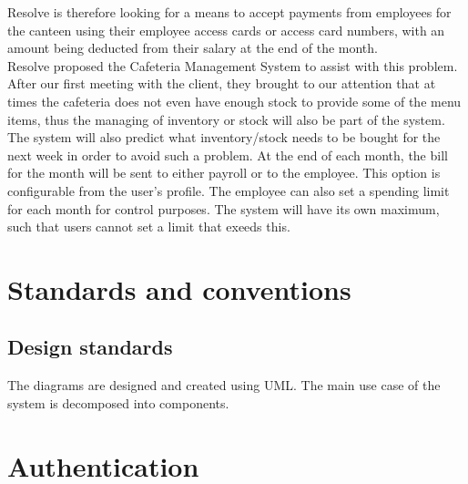 \documentclass[a4paper,12pt]{article}
\begin{document}
Resolve is therefore looking for a means to accept payments from employees for the canteen using their employee access cards or access card numbers, with an amount being deducted from their salary at the end of the month.\\

Resolve proposed the Cafeteria Management System to assist with this problem.
After our first meeting with the client, they brought to our attention that at times the cafeteria does not even have enough stock to provide some of the menu items, thus the managing of inventory or stock will also be part of the system. The system will also predict what inventory/stock needs to be bought for the next week in order to avoid such a problem. At the end of each month, the bill for the month will be sent to either payroll or to the employee. This option is configurable from the user's profile. The employee can also set a spending limit for each month for control purposes. The system will have its own maximum, such that users cannot set a limit that exeeds this. 


\section{Standards and conventions}

\subsection{Design standards}
 The diagrams are designed and created using UML. The main use case of the system is decomposed into components.
 
\section{Authentication}
\end{document}
